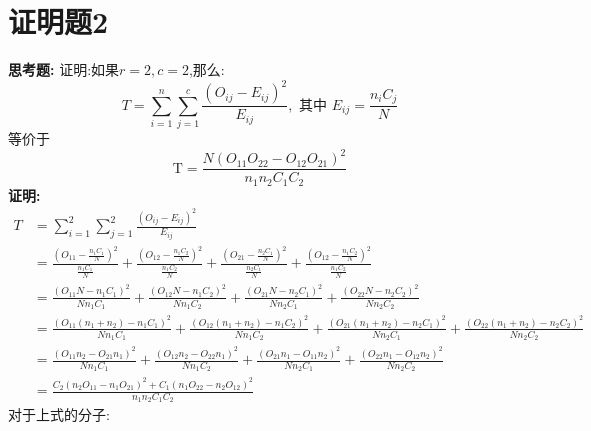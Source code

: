 \documentclass[a4paper, 11pt]{article}
\begin{document}
\section{证明题2}
\textbf{思考题:}
\indent 证明:如果$r=2,c=2$,那么:
$$T=\sum_{i=1}^{n} \sum_{j=1}^{c} \frac{\left(O_{i j}-E_{i j}\right)^{2}}{E_{i j}}, \text { 其中 } E_{i j}=\frac{n_{i} C_{j}}{N}$$
等价于
$$\mathrm{T}=\frac{N\left(O_{11} O_{22}-O_{12} O_{21}\right)^{2}}{n_{1} n_{2} C_{1} C_{2}}$$
\textbf{证明:}
\begin{equation}\nonumber
\begin{aligned}
T&=\sum_{i=1}^{2} \sum_{j=1}^{2} \frac{\left(O_{i j}-E_{i j}\right)^{2}}{E_{i j}} \\
&=\frac{\left(O_{11}-\frac{n_{1} C_{1}}{N}\right)^{2}}{\frac{n_{1} C_{1}}{N}}+\frac{\left(O_{12}-\frac{n_{1} C_{2}}{N}\right)^{2}}{\frac{n_{1} C_{2}}{N}}+\frac{\left(O_{21}-\frac{n_{2} C_{1}}{N}\right)^{2}}{\frac{n_{2} C_{1}}{N}}+\frac{\left(O_{12}-\frac{n_{1} C_{2}}{N}\right)^{2}}{\frac{n_{1} C_{2}}{N}} \\
&=\frac{\left(O_{11} N-n_{1} C_{1}\right)^{2}}{N n_{1} C_{1}}+\frac{\left(O_{12} N-n_{1} C_{2}\right)^{2}}{N n_{1} C_{2}}+\frac{\left(O_{21} N-n_{2} C_{1}\right)^{2}}{N n_{2} C_{1}}+\frac{\left(O_{22} N-n_{2} C_{2}\right)^{2}}{N n_{2} C_{2}} \\
&=\frac{\left(O_{11} (n_{1}+n_{2})-n_{1}C_{1}\right)^{2}}{N n_{1} C_{1}}+\frac{\left(O_{12} (n_{1}+n_{2})-n_{1}C_{2}\right)^{2}}{N n_{1} C_{2}}+\frac{\left(O_{21} (n_{1}+n_{2})-n_{2}C_{1}\right)^{2}}{N n_{2} C_{1}}+\frac{\left(O_{22} (n_{1}+n_{2})-n_{2}C_{2}\right)^{2}}{N n_{2} C_{2}} \\
&=\frac{\left(O_{11} n_{2}-O_{21} n_{1}\right)^{2}}{N n_{1} C_{1}}+\frac{\left(O_{12} n_{2}-O_{22} n_{1}\right)^{2}}{N n_{1} C_{2}}+\frac{\left(O_{21} n_{1}-O_{11} n_{2}\right)^{2}}{N n_{2} C_{1}}+\frac{\left(O_{22} n_{1}-O_{12} n_{2}\right)^{2}}{N n_{2} C_{2}} \\
&=\frac{C_{2}\left(n_{2} O_{11}-n_{1} O_{21}\right)^{2}+C_{1}\left(n_{1} O_{22}-n_{2} O_{12}\right)^{2}}{n_{1} n_{2} C_{1} C_{2}}
\end{aligned}
\end{equation}
对于上式的分子:
\end{document}
